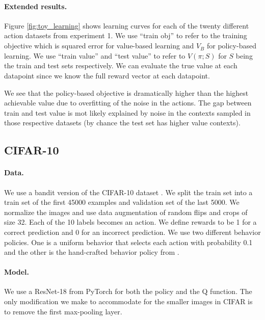 \paragraph{Extended results.}
Figure \ref{fig:toy_learning} shows learning curves for each of the twenty different action datasets from experiment 1. We use ``train obj'' to refer to the training objective which is squared error for value-based learning and $ \hat V_B$ for policy-based learning. We use ``train value'' and ``test value'' to refer to  $ V(\pi;S)$ for $ S$ being the train and test sets respectively. We can evaluate the true value at each datapoint since we know the full reward vector at each datapoint.

We see that the policy-based objective is dramatically higher than the highest achievable value due to overfitting of the noise in the actions. The gap between train and test value is mot likely explained by noise in the contexts sampled in those respective datasets (by chance the test set has higher value contexts).



\subsection{CIFAR-10}

\paragraph{Data.} We use a bandit version of the CIFAR-10 dataset \citep{Krizhevsky09learningmultiple}. We split the train set into a train set of the first 45000 examples and validation set of the last 5000. We normalize the images and use data augmentation of random flips and crops of size 32. Each of the 10 labels becomes an action. We define rewards to be 1 for a correct prediction and 0 for an incorrect prediction.
We use two different behavior policies. One is a uniform behavior that selects each action with probability 0.1 and the other is the hand-crafted behavior policy from \cite{joachims2018deep}.

\paragraph{Model.} We use a ResNet-18 \citep{he2016deep} from PyTorch \citep{paszke2019pytorch} for both the policy and the Q function. The only modification we make to accommodate for the smaller images in CIFAR is to remove the first max-pooling layer.

